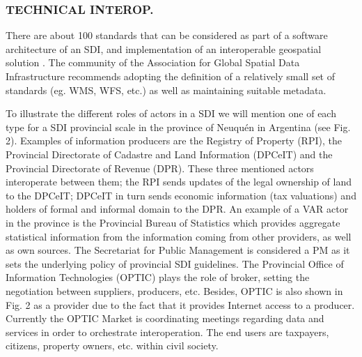 \documentclass[10pt,twocolumn,ieeetran]{article}
\begin{document}
\subsubsection{TECHNICAL INTEROP.}

There are about 100 standards that can be considered as part of a software architecture of an SDI, and implementation of an interoperable geospatial solution \cite{Masser}.
The community of the Association for Global Spatial Data Infrastructure recommends adopting the definition of a relatively small set of standards (eg. WMS, WFS, etc.) as well as maintaining suitable metadata.

To illustrate the different roles of actors in a SDI we will mention one of each type for a SDI provincial scale in the province of Neuqu\' en in Argentina (see Fig. 2). Examples of information producers are the Registry of Property (RPI), the Provincial Directorate of Cadastre and Land Information (DPCeIT) and the Provincial Directorate of Revenue (DPR).
These three  mentioned actors  interoperate between them; the RPI sends updates of the legal ownership of land to the  DPCeIT; DPCeIT in turn sends economic information (tax valuations) and holders of formal and informal domain to the DPR. An example of a VAR actor in the province is the Provincial Bureau of Statistics which provides  aggregate statistical information from the information coming from other providers, as well as own sources.
The Secretariat for Public Management is considered a PM as it sets  the underlying policy of provincial SDI guidelines. The Provincial Office of Information Technologies (OPTIC) plays the role of broker, setting the negotiation between suppliers, producers, etc. Besides, OPTIC is also shown in Fig. 2 as a provider due to the fact that it provides Internet access to a producer. Currently the OPTIC Market is coordinating meetings regarding  data and services in order to orchestrate interoperation. The end users are taxpayers, citizens, property owners, etc.  within civil society.
\end{document}
